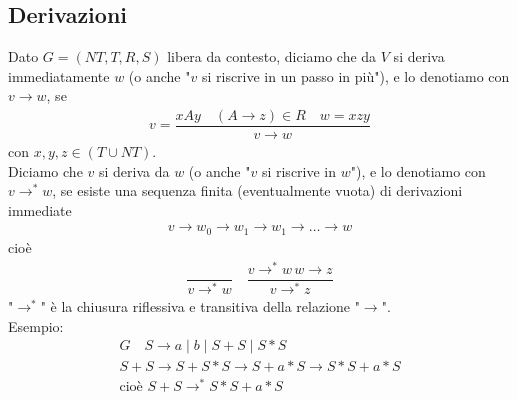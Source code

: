 \documentclass[a4paper,12pt]{article}
\begin{document}
\subsection{Derivazioni}
Dato $G=(NT,T,R,S)$ libera da contesto, diciamo che da $V$ si deriva immediatamente $w$ (o anche "$v$ si riscrive in un passo in più"), e lo denotiamo con $v \to w$, se
\begin{align*}
  v = \dfrac{xAy \quad (A \to z) \in R \quad w=xzy}{v \to w}
\end{align*}
con $x,y,z \in (T \cup NT)$. \\
Diciamo che $v$ si deriva da $w$ (o anche "$v$ si riscrive in $w$"), e lo denotiamo con $v \to^* w$, se esiste una sequenza finita (eventualmente vuota) di derivazioni immediate
\begin{align*}
v \to w_0 \to w_1 \to  w_1 \to \dots \to w
\end{align*}
cioè
\begin{align*}
  \dfrac{}{v \to^* w} \quad \dfrac{v \to^* w \, w \to z}{v \to^* z}
\end{align*}
"$\to^*$" è la chiusura riflessiva e transitiva della relazione "$\to$". \\
Esempio: 
\begin{align*}
  G \quad S \to a \mid b \mid S+S \mid S*S \\
  S+S \to S+S*S \to S+a*S \to S*S+a*S \\
  \text{cioè } S+S \to^* S*S+a*S
\end{align*}
\end{document}
